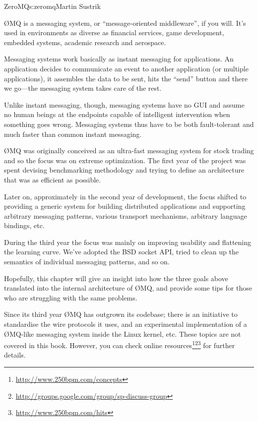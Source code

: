 \begin{aosachapter}{ZeroMQ}{s:zeromq}{Martin Sustrik}


{\O}MQ is a messaging system, or ``message-oriented middleware'', if you
will. It's used in environments as diverse as financial services, game
development, embedded systems, academic research and aerospace.

Messaging systems work basically as instant messaging for
applications. An application decides to communicate an event to
another application (or multiple applications), it assembles the data
to be sent, hits the ``send'' button and there we go---the messaging
system takes care of the rest.

Unlike instant messaging, though, messaging systems have no GUI and
assume no human beings at the endpoints capable of intelligent
intervention when something goes wrong. Messaging systems thus have to
be both fault-tolerant and much faster than common instant messaging.

{\O}MQ was originally conceived as an ultra-fast messaging system
for stock trading and so the focus was on extreme optimization. The
first year of the project was spent devising benchmarking methodology
and trying to define an architecture that was as efficient as possible.

Later on, approximately in the second year of development, the focus
shifted to providing a generic system for building distributed
applications and supporting arbitrary messaging patterns, various
transport mechanisms, arbitrary language bindings, etc.

During the third year the focus was mainly on improving usability and 
flattening the learning curve. We've adopted the BSD socket API, tried to
clean up the semantics of individual messaging patterns, and so on.

Hopefully, this chapter will give an insight into how the three goals
above translated into the internal architecture of {\O}MQ, and provide
some tips for those who are struggling with the same problems.

Since its third year {\O}MQ has outgrown its codebase; there is
an initiative to standardise the wire protocols it uses, and an
experimental implementation of a {\O}MQ-like messaging system inside the Linux
kernel, etc.  These topics are not covered in this book. However, you can check
online
resources\footnote{\url{http://www.250bpm.com/concepts}}\footnote{\url{http://groups.google.com/group/sp-discuss-group}}\footnote{\url{http://www.250bpm.com/hits}}
for further details.


\end{aosachapter}
